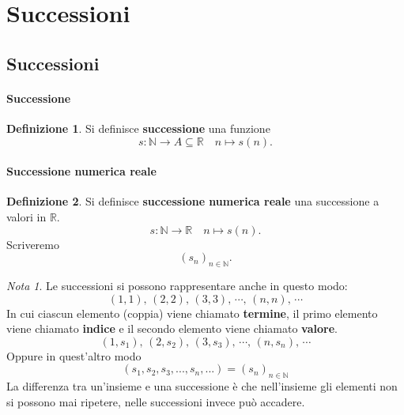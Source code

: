\documentclass{article}
\theoremstyle{plain}
\theoremstyle{definition}
\newtheorem{defn}{Definizione}[section]
\theoremstyle{remark}
\newtheorem{note}{Nota}
\begin{document}
\vspace{50pt}
\section{Successioni}
\vspace{50pt}

\subsection{Successioni}

\vspace{10pt}

\paragraph{Successione}
\begin{bxthm}
\begin{defn}
    Si definisce \textbf{successione} una funzione 
    \[s:\mathbb{N}\to A\subseteq\mathbb{R}\quad n\mapsto s(n).\]
\end{defn}
\end{bxthm}

\vspace{10pt}

\paragraph{Successione numerica reale}
\begin{bxthm}
\begin{defn}
    Si definisce \textbf{successione numerica reale} una successione a valori in $\mathbb{R}$.
    \[s:\mathbb{N}\to \mathbb{R}\quad n\mapsto s(n).\]
    Scriveremo \[(s_n)_{n\in\mathbb{N}}.\]
\end{defn}
\end{bxthm}

\vspace{10pt}

\begin{note}
Le successioni si possono rappresentare anche in questo modo:
\[(1,1),\,(2,2),\,(3,3),\,\cdots,\,(n,n),\,\cdots\]
In cui ciascun elemento (coppia) viene chiamato \textbf{termine}, il primo elemento viene chiamato \textbf{indice} e il secondo elemento viene chiamato \textbf{valore}.
\[(1,s_1),\,(2,s_2),\,(3,s_3),\,\cdots,\,(n,s_n),\,\cdots\]
Oppure in quest'altro modo
\[(s_1,s_2,s_3,...,s_n,...)=(s_n)_{n\in\mathbb{N}}\]
La differenza tra un'insieme e una successione è che nell'insieme gli elementi non si possono mai ripetere, nelle successioni invece può accadere.
\end{note}
\end{document}
